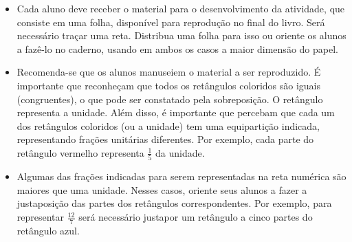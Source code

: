 \begin{orientacoes}{}{}
\begin{itemize} %
    \item  Cada aluno deve receber o material para o desenvolvimento da atividade, que consiste em uma folha, disponível para reprodução no final do livro. Será necessário traçar uma reta. Distribua uma folha para isso ou oriente os alunos a fazê-lo no caderno, usando em ambos os casos a maior dimensão do papel.
    \item Recomenda-se que os alunos manuseiem o material a ser reproduzido. É importante que reconheçam que todos os retângulos coloridos são iguais (congruentes), o que pode ser constatado pela sobreposição. O retângulo representa a unidade. Além disso, é importante que percebam que cada um dos retângulos coloridos (ou a unidade) tem uma equipartição indicada, representando frações unitárias diferentes. Por exemplo, cada parte do retângulo vermelho representa       $\frac{1}{5}$       da unidade.
    \item       Algumas das frações indicadas para serem representadas na reta numérica são maiores que uma unidade. Nesses casos, oriente seus alunos a fazer a justaposição das partes dos retângulos correspondentes. Por exemplo, para representar       $\frac{12}{7}$       será necessário justapor um retângulo a cinco partes do retângulo azul.
\end{itemize} %
\end{orientacoes}
\clearpage

